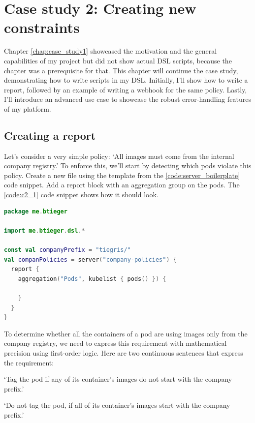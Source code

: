 \chapter{Case study 2: Creating new constraints}
\label{chap:case_study2}

Chapter \ref{chap:case_study1} showcased the motivation and the general capabilities of my project but did not show actual DSL scripts, because the  chapter was a prerequisite for that. This chapter will continue the case study, demonstrating how to write scripts in my DSL. Initially, I'll show how to write a report, followed by an example of writing a webhook for the same policy. Lastly, I'll introduce an advanced use case to showcase the robust error-handling features of my platform.

\section{Creating a report}

Let's consider a very simple policy: `All images must come from the internal company registry.' To enforce this, we'll start by detecting which pods violate this policy. Create a new file using the template from the \ref{code:server_boilerplate} code snippet. Add a report block with an aggregation group on the pods. The \ref{code:c2_1} code snippet shows how it should look.

\begin{minipage}{\linewidth}
\begin{lstlisting}[caption={Report skeleton},language=Kotlin,label=code:c2_1]
package me.btieger

import me.btieger.dsl.*

const val companyPrefix = "tiegris/"
val companPolicies = server("company-policies") {
  report {
    aggregation("Pods", kubelist { pods() }) {
  
    }
  }
}
\end{lstlisting}
\end{minipage}

To determine whether all the containers of a pod are using images only from the company registry, we need to express this requirement with mathematical precision using first-order logic. Here are two continuous sentences that express the requirement:

`Tag the pod if any of its container's images do not start with the company prefix.'

`Do not tag the pod, if all of its container's images start with the company prefix.'

